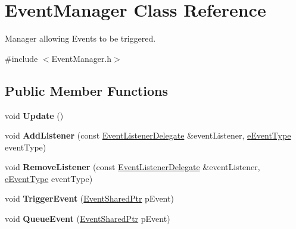 \hypertarget{classEventManager}{\section{Event\-Manager Class Reference}
\label{classEventManager}
}


Manager allowing Events to be triggered.  




{\ttfamily \#include $<$Event\-Manager.\-h$>$}

\subsection*{Public Member Functions}
\begin{DoxyCompactItemize}
\item 
\hypertarget{classEventManager_a4bf667988bd84c7d8d179816adee5213}{void {\bfseries Update} ()}\label{classEventManager_a4bf667988bd84c7d8d179816adee5213}

\item 
\hypertarget{classEventManager_a67f1f819fb4a2b73332096821807efed}{void {\bfseries Add\-Listener} (const \hyperlink{IEvent_8h_aec13e0c22bae1765dcadd7f9fa55514b}{Event\-Listener\-Delegate} \&event\-Listener, \hyperlink{IEvent_8h_a052e637824ed8cb8a5e9d5d73b5b3c8b}{e\-Event\-Type} event\-Type)}\label{classEventManager_a67f1f819fb4a2b73332096821807efed}

\item 
\hypertarget{classEventManager_acefd95e8e98cb9599b4e4e7fc8d096cb}{void {\bfseries Remove\-Listener} (const \hyperlink{IEvent_8h_aec13e0c22bae1765dcadd7f9fa55514b}{Event\-Listener\-Delegate} \&event\-Listener, \hyperlink{IEvent_8h_a052e637824ed8cb8a5e9d5d73b5b3c8b}{e\-Event\-Type} event\-Type)}\label{classEventManager_acefd95e8e98cb9599b4e4e7fc8d096cb}

\item 
\hypertarget{classEventManager_a96ffc88f98bbc1216e1540d9c2f112bd}{void {\bfseries Trigger\-Event} (\hyperlink{IEvent_8h_acf266fae1ccf111c04861cc2a370b2d0}{Event\-Shared\-Ptr} p\-Event)}\label{classEventManager_a96ffc88f98bbc1216e1540d9c2f112bd}

\item 
\hypertarget{classEventManager_ab3a7c33b4f4ab18476f84f62c7a8ceea}{void {\bfseries Queue\-Event} (\hyperlink{IEvent_8h_acf266fae1ccf111c04861cc2a370b2d0}{Event\-Shared\-Ptr} p\-Event)}\label{classEventManager_ab3a7c33b4f4ab18476f84f62c7a8ceea}

\end{DoxyCompactItemize}
